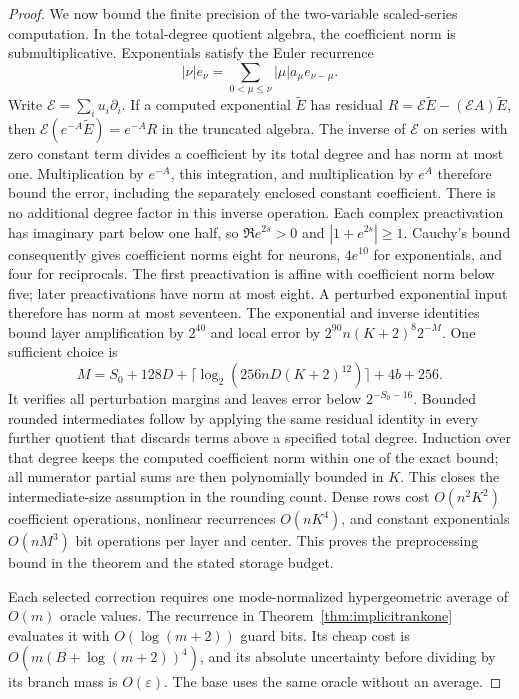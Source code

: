 \begin{proof}
We now bound the finite precision of the two-variable scaled-series
computation. In the total-degree quotient
algebra, the coefficient norm is submultiplicative. Exponentials
satisfy the Euler recurrence
\[
 |\nu|e_\nu=\sum_{0<\mu\le\nu}|\mu|a_\mu e_{\nu-\mu}.
\]
Write $\mathcal E=\sum_i u_i\partial_i$. If a computed exponential
$\widetilde E$ has residual
$R=\mathcal E\widetilde E-(\mathcal EA)\widetilde E$, then
$\mathcal E(e^{-A}\widetilde E)=e^{-A}R$ in the truncated algebra.
The inverse of $\mathcal E$ on series with zero constant term
divides a coefficient by its total degree and has norm at most one.
Multiplication by $e^{-A}$, this integration, and multiplication by
$e^A$ therefore bound the error, including the separately enclosed
constant coefficient. There is no additional degree factor in this
inverse operation. Each complex preactivation has imaginary part
below one half, so $\Re e^{2s}>0$ and $|1+e^{2s}|\ge1$.
Cauchy's bound consequently gives coefficient norms eight
for neurons, $4e^{10}$ for exponentials, and four for reciprocals.
The first preactivation is affine with coefficient norm below five;
later preactivations have norm at most eight. A perturbed exponential
input therefore has norm at most seventeen. The exponential and
inverse identities bound layer amplification by $2^{40}$ and local
error by $2^{90}n(K+2)^8 2^{-M}$. One sufficient choice is
\[
 M=S_0+128D+\lceil\log_2(256nD(K+2)^{12})\rceil+4b+256.
\]
It verifies all perturbation margins and leaves error below
$2^{-S_0-16}$. Bounded rounded intermediates follow by applying the
same residual identity in every further quotient that discards
terms above a specified total degree. Induction over that degree
keeps the computed coefficient norm within one of the exact bound;
all numerator partial sums are then polynomially bounded in $K$.
This closes the intermediate-size assumption in the rounding count.
Dense rows cost $O(n^2K^2)$ coefficient operations,
nonlinear recurrences $O(nK^4)$, and constant exponentials
$O(nM^3)$ bit operations per layer and center. This proves the
preprocessing bound in the theorem and the stated storage budget.

Each selected correction requires one mode-normalized
hypergeometric average of $O(m)$ oracle values. The recurrence in
Theorem~\ref{thm:implicitrankone} evaluates it with
$O(\log(m+2))$ guard bits. Its cheap cost is
$O(m(B+\log(m+2))^4)$, and its absolute uncertainty before dividing
by its branch mass is $O(\varepsilon)$. The base uses the same
oracle without an average.


\end{proof}
